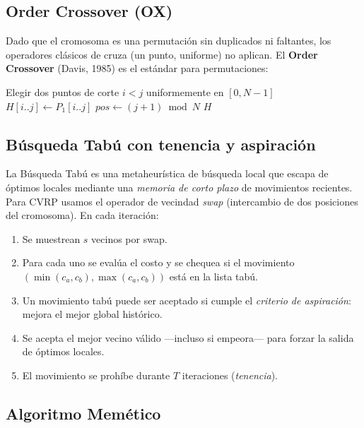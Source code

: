 \subsection{Order Crossover (OX)}

Dado que el cromosoma es una permutación sin duplicados ni faltantes, los operadores clásicos de cruza (un punto, uniforme) no aplican. El \textbf{Order Crossover} (Davis, 1985) es el estándar para permutaciones:

\begin{algorithm}[H]
\SetAlgoLined
\caption{Order Crossover (OX)}
Elegir dos puntos de corte $i < j$ uniformemente en $[0, N-1]$\;
$H[i..j] \leftarrow P_1[i..j]$\;
$pos \leftarrow (j + 1) \bmod N$\;
\Return $H$\;
\end{algorithm}

\subsection{Búsqueda Tabú con tenencia y aspiración}

La Búsqueda Tabú \cite{glover1986future} es una metaheurística de búsqueda local que escapa de óptimos locales mediante una \emph{memoria de corto plazo} de movimientos recientes. Para CVRP usamos el operador de vecindad \emph{swap} (intercambio de dos posiciones del cromosoma). En cada iteración:

\begin{enumerate}
    \item Se muestrean $s$ vecinos por swap.
    \item Para cada uno se evalúa el costo y se chequea si el movimiento $(\min(c_a, c_b), \max(c_a, c_b))$ está en la lista tabú.
    \item Un movimiento tabú puede ser aceptado si cumple el \emph{criterio de aspiración}: mejora el mejor global histórico.
    \item Se acepta el mejor vecino válido —incluso si empeora— para forzar la salida de óptimos locales.
    \item El movimiento se prohíbe durante $T$ iteraciones (\emph{tenencia}).
\end{enumerate}

\subsection{Algoritmo Memético}

